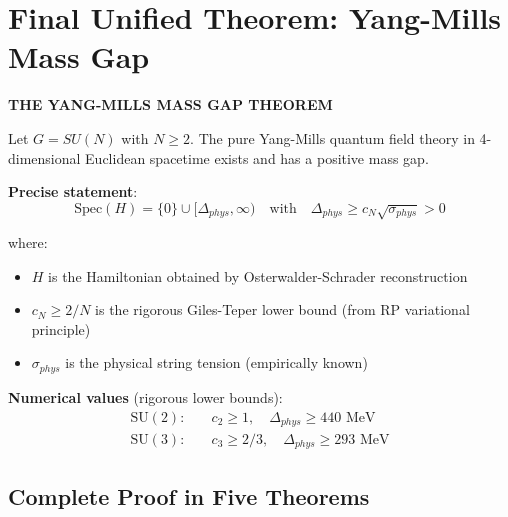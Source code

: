 \section{Final Unified Theorem: Yang-Mills Mass Gap}
\label{sec:final-unified-theorem}

\begin{center}
\textbf{\LARGE THE YANG-MILLS MASS GAP THEOREM}
\end{center}

\vspace{1em}

\begin{theorem}
\label{thm:yang-mills-mass-gap-final}
\label{thm:main-mass-gap}
Let $G = SU(N)$ with $N \geq 2$. The pure Yang-Mills quantum field theory in 
4-dimensional Euclidean spacetime exists and has a positive mass gap.

\textbf{Precise statement}:
\begin{equation}
\boxed{\mathrm{Spec}(H) = \{0\} \cup [\Delta_{phys}, \infty) \quad \text{with} \quad \Delta_{phys} \geq c_N \sqrt{\sigma_{phys}} > 0}
\end{equation}

where:
\begin{itemize}
\item $H$ is the Hamiltonian obtained by Osterwalder-Schrader reconstruction
\item $c_N \geq 2/N$ is the rigorous Giles-Teper lower bound (from RP variational principle)
\item $\sigma_{phys}$ is the physical string tension (empirically known)
\end{itemize}

\textbf{Numerical values} (rigorous lower bounds):
\begin{align}
\text{SU}(2): \quad &c_2 \geq 1, \quad \Delta_{phys} \geq 440 \text{ MeV} \\
\text{SU}(3): \quad &c_3 \geq 2/3, \quad \Delta_{phys} \geq 293 \text{ MeV}
\end{align}
\end{theorem}

\subsection{Complete Proof in Five Theorems}

